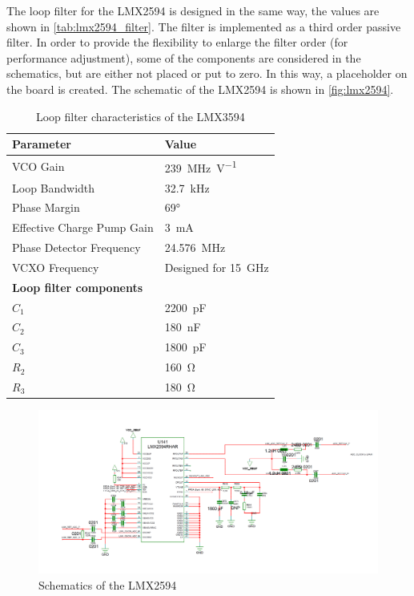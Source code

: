 The loop filter for the LMX2594 is designed in the same way, the values are shown in \autoref{tab:lmx2594_filter}.
The filter is implemented as a third order passive filter.
In order to provide the flexibility to enlarge the filter order (for performance adjustment), some of the components are considered in the schematics, but are either not placed or put to zero. 
In this way, a placeholder on the board is created.
The schematic of the LMX2594 is shown in \autoref{fig:lmx2594}.
\begin{table}[tbh]
	\caption[LMX2594 loop filter characteristics]{Loop filter characteristics of the LMX3594}
	\label{tab:lmx2594_filter}
	\centering
	\begin{tabularx}{\textwidth}{Xl}
		\toprule
		\textbf{Parameter}                         & \textbf{Value}             \\ \bottomrule
		VCO Gain                                   & \SI{239}{\MHz\per\volt}    \\
		Loop Bandwidth                             & \SI{32.7}{\kHz}            \\
		Phase Margin                               & \ang{69}                   \\
		Effective Charge Pump Gain                 & \SI{3}{\milli\ampere}      \\
		Phase Detector Frequency                   & \SI{24.576}{\MHz}          \\
		VCXO Frequency                             & Designed for \SI{15}{\GHz} \\
		[0.3cm]
		 \textbf{Loop filter components} &                            \\
		$C_{1}$                          & \SI{2200}{\pico\farad}     \\
		$C_{2}$                          & \SI{180}{\nano\farad}      \\
		$C_{3}$                          & \SI{1800}{\pico\farad}     \\
		$R_{2}$                                    & \SI{160}{\ohm}             \\
		$R_{3}$                          & \SI{180}{\ohm}             \\ \bottomrule
	\end{tabularx}
\end{table}

\begin{figure}[tbh]
	\centering
	\includegraphics[width = \textwidth]{chap/04-work/img/lmx2594}
	\caption{Schematics of the LMX2594}
	\label{fig:lmx2594}
\end{figure}

